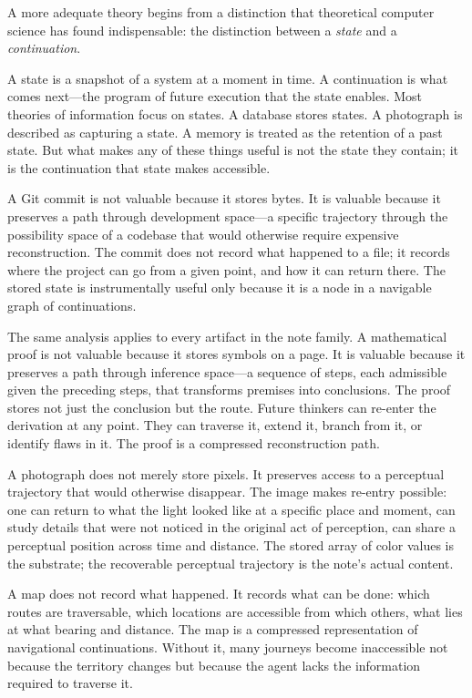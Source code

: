 \documentclass[12pt, a4paper]{article}
\begin{document}
A more adequate theory begins from a distinction that theoretical computer science
has found indispensable: the distinction between a \emph{state} and a
\emph{continuation}.

A state is a snapshot of a system at a moment in time. A continuation is what
comes next---the program of future execution that the state enables. Most theories
of information focus on states. A database stores states. A photograph is
described as capturing a state. A memory is treated as the retention of a past
state. But what makes any of these things useful is not the state they contain; it
is the continuation that state makes accessible.

A Git commit is not valuable because it stores bytes. It is valuable because it
preserves a path through development space---a specific trajectory through the
possibility space of a codebase that would otherwise require expensive
reconstruction. The commit does not record what happened to a file; it records
where the project can go from a given point, and how it can return there. The
stored state is instrumentally useful only because it is a node in a navigable
graph of continuations.

The same analysis applies to every artifact in the note family. A mathematical
proof is not valuable because it stores symbols on a page. It is valuable because
it preserves a path through inference space---a sequence of steps, each admissible
given the preceding steps, that transforms premises into conclusions. The proof
stores not just the conclusion but the route. Future thinkers can re-enter the
derivation at any point. They can traverse it, extend it, branch from it, or
identify flaws in it. The proof is a compressed reconstruction path.

A photograph does not merely store pixels. It preserves access to a perceptual
trajectory that would otherwise disappear. The image makes re-entry possible: one
can return to what the light looked like at a specific place and moment, can study
details that were not noticed in the original act of perception, can share a
perceptual position across time and distance. The stored array of color values is
the substrate; the recoverable perceptual trajectory is the note's actual content.

A map does not record what happened. It records what can be done: which routes are
traversable, which locations are accessible from which others, what lies at what
bearing and distance. The map is a compressed representation of navigational
continuations. Without it, many journeys become inaccessible not because the
territory changes but because the agent lacks the information required to traverse
it.
\end{document}
